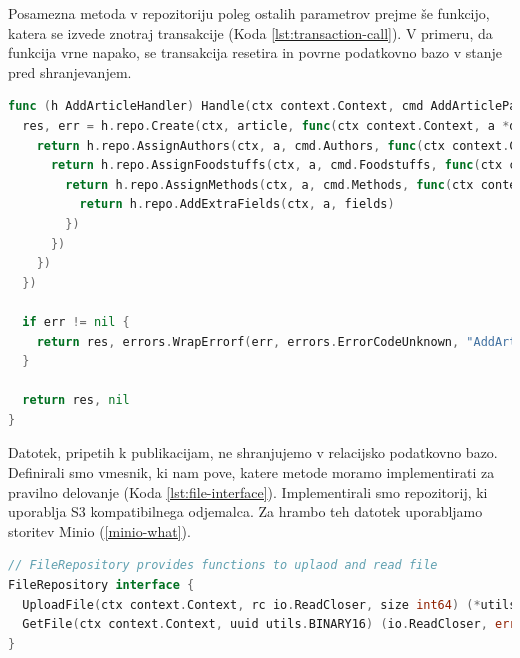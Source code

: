 Posamezna metoda v repozitoriju poleg ostalih parametrov prejme še funkcijo, katera se izvede znotraj transakcije (Koda \ref{lst:transaction-call}). V primeru, da funkcija vrne napako, se transakcija resetira in povrne podatkovno bazo v stanje pred shranjevanjem.

\begin{lstlisting}[language=go,style=mystyle,caption={ Prikaz shranjevanja publikacije. },label=lst:transaction-call]
func (h AddArticleHandler) Handle(ctx context.Context, cmd AddArticleParamsCmd) (res *domain.Article, err error) {
  res, err = h.repo.Create(ctx, article, func(ctx context.Context, a *domain.Article) error {
    return h.repo.AssignAuthors(ctx, a, cmd.Authors, func(ctx context.Context, a *domain.Article) error {
      return h.repo.AssignFoodstuffs(ctx, a, cmd.Foodstuffs, func(ctx context.Context, a *domain.Article) error {
        return h.repo.AssignMethods(ctx, a, cmd.Methods, func(ctx context.Context, a *domain.Article) error {
          return h.repo.AddExtraFields(ctx, a, fields)
        })
      })
    })
  })

  if err != nil {
    return res, errors.WrapErrorf(err, errors.ErrorCodeUnknown, "AddArticleHandler.repo")
  }

  return res, nil
}
\end{lstlisting}

Datotek, pripetih k publikacijam, ne shranjujemo v relacijsko podatkovno bazo. Definirali smo vmesnik, ki nam pove, katere metode moramo implementirati za pravilno delovanje (Koda \ref{lst:file-interface}). Implementirali smo repozitorij, ki uporablja S3 kompatibilnega odjemalca. Za hrambo teh datotek uporabljamo storitev Minio (\ref{minio-what}).

\begin{lstlisting}[language=go,style=mystyle,caption={Prikaz vmesnika za shranjevanje in branje datotek.},label=lst:file-interface]
// FileRepository provides functions to uplaod and read file
FileRepository interface {
  UploadFile(ctx context.Context, rc io.ReadCloser, size int64) (*utils.BINARY16, error)
  GetFile(ctx context.Context, uuid utils.BINARY16) (io.ReadCloser, error)
}
\end{lstlisting}



